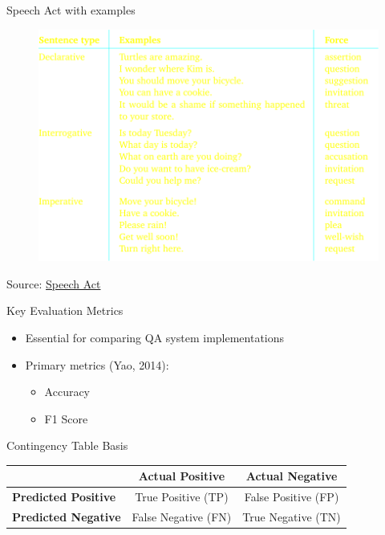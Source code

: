 \begin{frame}{Speech Act with examples}
    \begin{figure}
        \includegraphics[width=0.7\linewidth]{Images/speech_Act_Example}
        \label{fig:speechactexample}
    \end{figure}
    Source: \href{https://web.stanford.edu/class/linguist130a/2022/materials/ling130a-handout-03-08-speechacts.pdf}{Speech Act}
\end{frame}


\begin{frame}{Key Evaluation Metrics}
\begin{itemize}
    \item Essential for comparing QA system implementations
    \item Primary metrics (Yao, 2014):
    \begin{itemize}
        \item Accuracy
        \item F1 Score
    \end{itemize}
\end{itemize}
\end{frame}

\begin{frame}{Contingency Table Basis}
\begin{table}
\centering
\begin{tabular}{lcc}
\hline
 & \textbf{Actual Positive} & \textbf{Actual Negative} \\
\hline
\textbf{Predicted Positive} & True Positive (TP) & False Positive (FP) \\
\textbf{Predicted Negative} & False Negative (FN) & True Negative (TN) \\
\hline
\end{tabular}
\end{table}
\end{frame}

